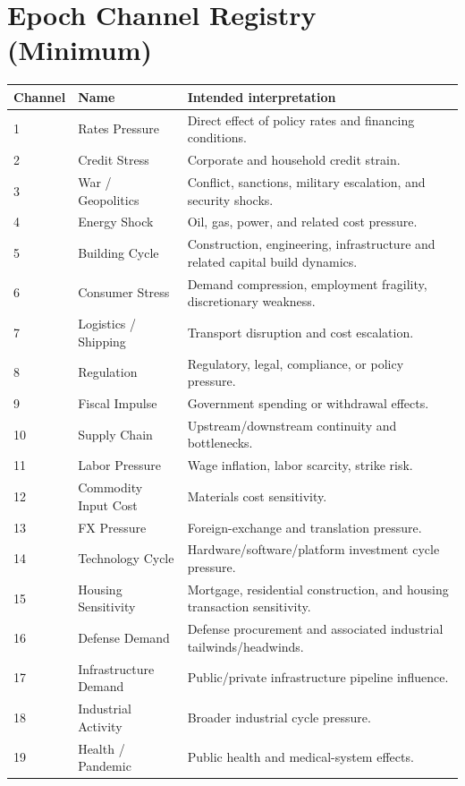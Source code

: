 \documentclass[11pt]{report}
\begin{document}
\chapter{Epoch Channel Registry (Minimum)}
\renewcommand{\arraystretch}{1.12}
\begin{longtable}{p{}p{}p{}}
\toprule
Channel & Name & Intended interpretation \\
\midrule
1 & Rates Pressure & Direct effect of policy rates and financing conditions. \\
2 & Credit Stress & Corporate and household credit strain. \\
3 & War / Geopolitics & Conflict, sanctions, military escalation, and security shocks. \\
4 & Energy Shock & Oil, gas, power, and related cost pressure. \\
5 & Building Cycle & Construction, engineering, infrastructure and related capital build dynamics. \\
6 & Consumer Stress & Demand compression, employment fragility, discretionary weakness. \\
7 & Logistics / Shipping & Transport disruption and cost escalation. \\
8 & Regulation & Regulatory, legal, compliance, or policy pressure. \\
9 & Fiscal Impulse & Government spending or withdrawal effects. \\
10 & Supply Chain & Upstream/downstream continuity and bottlenecks. \\
11 & Labor Pressure & Wage inflation, labor scarcity, strike risk. \\
12 & Commodity Input Cost & Materials cost sensitivity. \\
13 & FX Pressure & Foreign-exchange and translation pressure. \\
14 & Technology Cycle & Hardware/software/platform investment cycle pressure. \\
15 & Housing Sensitivity & Mortgage, residential construction, and housing transaction sensitivity. \\
16 & Defense Demand & Defense procurement and associated industrial tailwinds/headwinds. \\
17 & Infrastructure Demand & Public/private infrastructure pipeline influence. \\
18 & Industrial Activity & Broader industrial cycle pressure. \\
19 & Health / Pandemic & Public health and medical-system effects. \\

\end{longtable}
\end{document}
